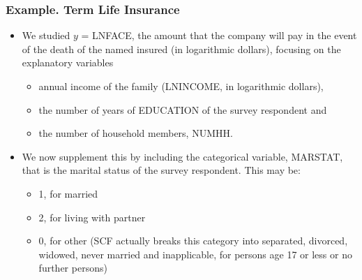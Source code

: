 \begin{frame}
 \frametitle{Example. Term Life Insurance}
 \begin{itemize}
   \item We studied $y$ = LNFACE, the amount that the company will pay in the event
of the death of the named insured (in logarithmic dollars), focusing
on the explanatory variables
 \begin{itemize}
 \item
annual income of the family (LNINCOME, in logarithmic dollars),
 \item the number of years of EDUCATION of the
survey respondent and
 \item the number of household members, NUMHH.
 \end{itemize}
\item We now supplement this by including the categorical variable,
MARSTAT, that is the marital status of the survey respondent. This
may be:
\begin{itemize}
 \item 1, for married
 \item 2, for living with partner
 \item 0, for other (SCF actually breaks this category into
 separated, divorced, widowed, never married and inapplicable, for
 persons age 17 or less or no further persons)
 \end{itemize}

 \end{itemize}
\end{frame}


